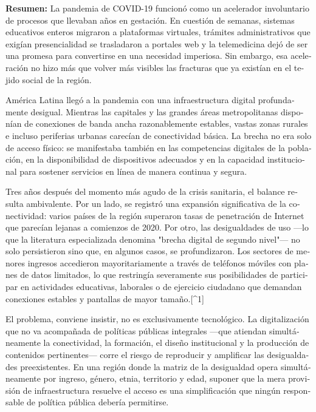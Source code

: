 \documentclass{article}
\begin{document}
\begin{tcolorbox}[colback=brown!8!white,colframe=brown!8!white,boxrule=0pt,arc=2pt,left=4pt,right=4pt,top=3pt,bottom=3pt,before skip=4pt,after skip=4pt]
\begin{otherlanguage}{spanish}
\sffamily\small \textbf{Resumen:} La pandemia de COVID-19 funcionó como un acelerador involuntario de procesos que llevaban años en gestación. En cuestión de semanas, sistemas educativos enteros migraron a plataformas virtuales, trámites administrativos que exigían presencialidad se trasladaron a portales web y la telemedicina dejó de ser una promesa para convertirse en una necesidad imperiosa. Sin embargo, esa aceleración no hizo más que volver más visibles las fracturas que ya existían en el tejido social de la región.

América Latina llegó a la pandemia con una infraestructura digital profundamente desigual. Mientras las capitales y las grandes áreas metropolitanas disponían de conexiones de banda ancha razonablemente estables, vastas zonas rurales e incluso periferias urbanas carecían de conectividad básica. La brecha no era solo de acceso físico: se manifestaba también en las competencias digitales de la población, en la disponibilidad de dispositivos adecuados y en la capacidad institucional para sostener servicios en línea de manera continua y segura.

Tres años después del momento más agudo de la crisis sanitaria, el balance resulta ambivalente. Por un lado, se registró una expansión significativa de la conectividad: varios países de la región superaron tasas de penetración de Internet que parecían lejanas a comienzos de 2020. Por otro, las desigualdades de uso ---lo que la literatura especializada denomina "brecha digital de segundo nivel"--- no solo persistieron sino que, en algunos casos, se profundizaron. Los sectores de menores ingresos accedieron mayoritariamente a través de teléfonos móviles con planes de datos limitados, lo que restringía severamente sus posibilidades de participar en actividades educativas, laborales o de ejercicio ciudadano que demandan conexiones estables y pantallas de mayor tamaño.[\textasciicircum{}1]

El problema, conviene insistir, no es exclusivamente tecnológico. La digitalización que no va acompañada de políticas públicas integrales ---que atiendan simultáneamente la conectividad, la formación, el diseño institucional y la producción de contenidos pertinentes--- corre el riesgo de reproducir y amplificar las desigualdades preexistentes. En una región donde la matriz de la desigualdad opera simultáneamente por ingreso, género, etnia, territorio y edad, suponer que la mera provisión de infraestructura resuelve el acceso es una simplificación que ningún responsable de política pública debería permitirse.


\end{otherlanguage}
\end{tcolorbox}
\end{document}
